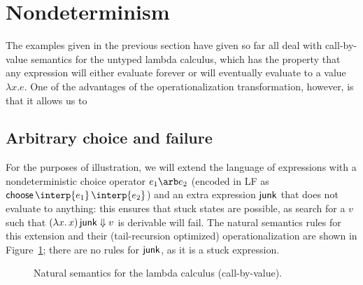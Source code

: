 \section{Nondeterminism}
\label{sec:absmachine-nondeterminism}

The examples given in the previous section have given so far all deal
with call-by-value semantics for the untyped lambda calculus, which
has the property that any expression will either evaluate forever or
will eventually evaluate to a value $\lambda x. e$. One of the
advantages of the operationalization transformation, however, is that
it allows us to


\subsection{Arbitrary choice and failure}

For the purposes of illustration, we will extend the language of
expressions with a nondeterministic choice operator $e_1 \arb e_2$
(encoded in LF as ${\sf choose}\,\interp{e_1}\,\interp{e_2}$) and an
extra expression ${\sf junk}$ that does not evaluate to anything: this
ensures that stuck states are possible, as search for a $v$ such that
$(\lambda x.\,x)\,{\sf junk} \Downarrow v$ is derivable will fail.
The natural semantics rules for this extension and their
(tail-recursion optimized) operationalization are shown in
Figure~\ref{fig:ns-arb}; there are no rules for ${\sf junk}$, as it is
a stuck expression.

\begin{figure}[t]
\begin{minipage}[b]{0.45\linewidth}
\end{minipage}
\hspace{0.5cm}
\begin{minipage}[b]{0.55\linewidth}
\end{minipage}
\caption{Natural semantics for the lambda calculus (call-by-value).}
\label{fig:ns-arb}
\end{figure}


